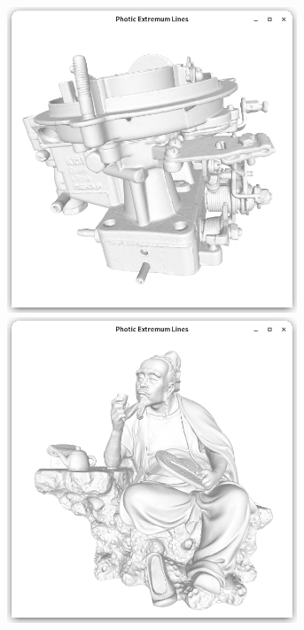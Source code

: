 \documentclass[9pt,fleqn,twoside,twocolumn]{stdglobal}
\begin{document}
    \begin{figure}
      \centering
      \begin{subfigure}[t]{0.19\textwidth}
        \centering
        \includegraphics[width=0.95\textwidth,trim={15px 15 15 50},clip]{images/results/carburetor.png}
        \includegraphics[width=0.95\textwidth,trim={15px 15 15 50},clip]{images/results/luyu.png}

\end{subfigure}
\end{figure}
\end{document}
